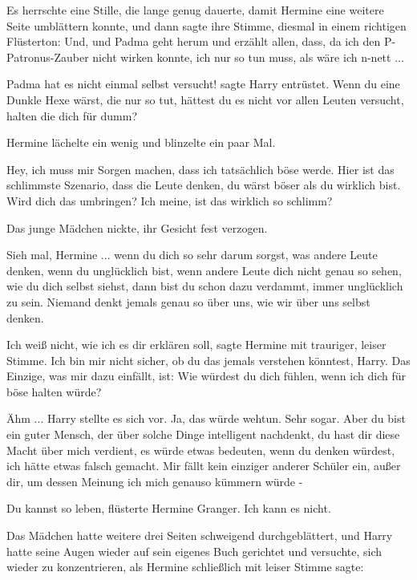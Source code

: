 Es herrschte eine Stille, die lange genug dauerte, damit Hermine eine weitere
Seite umblättern konnte, und dann sagte ihre Stimme, diesmal in einem richtigen
Flüsterton: \glqq{}Und, und Padma geht herum und erzählt allen, dass, da ich den
P-Patronus-Zauber nicht wirken konnte, ich nur so tun muss, als wäre ich
n-nett ...\grqq{}

\glqq{}Padma hat es nicht einmal selbst versucht!\grqq{} sagte Harry entrüstet.
\glqq{}Wenn du eine Dunkle Hexe wärst, die nur so tut, hättest du es nicht vor
allen Leuten versucht, halten die dich für dumm?\grqq{}

Hermine lächelte ein wenig und blinzelte ein paar Mal.

\glqq{}Hey, ich muss mir Sorgen machen, dass ich tatsächlich böse werde. Hier ist
das schlimmste Szenario, dass die Leute denken, du wärst böser als du wirklich
bist. Wird dich das umbringen? Ich meine, ist das wirklich so schlimm?\grqq{}

Das junge Mädchen nickte, ihr Gesicht fest verzogen.

\glqq{}Sieh mal, Hermine ... wenn du dich so sehr darum sorgst, was andere Leute
denken, wenn du unglücklich bist, wenn andere Leute dich nicht genau so sehen,
wie du dich selbst siehst, dann bist du schon dazu verdammt, immer unglücklich
zu sein. Niemand denkt jemals genau so über uns, wie wir über uns selbst
denken.\grqq{}

\glqq{}Ich weiß nicht, wie ich es dir erklären soll\grqq{}, sagte Hermine mit
trauriger, leiser Stimme. \glqq{}Ich bin mir nicht sicher, ob du das jemals
verstehen könntest, Harry. Das Einzige, was mir dazu einfällt, ist: Wie würdest
du dich fühlen, wenn ich dich für böse halten würde?\grqq{}

\glqq{}Ähm ...\grqq{} Harry stellte es sich vor. \glqq{}Ja, das würde wehtun. Sehr
sogar. Aber du bist ein guter Mensch, der über solche Dinge intelligent
nachdenkt, du hast dir diese Macht über mich verdient, es würde etwas bedeuten,
wenn du denken würdest, ich hätte etwas falsch gemacht. Mir fällt kein einziger
anderer Schüler ein, außer dir, um dessen Meinung ich mich genauso kümmern würde
-\grqq{}

\glqq{}Du kannst so leben\grqq{}, flüsterte Hermine Granger. \glqq{}Ich kann es
nicht.\grqq{}

Das Mädchen hatte weitere drei Seiten schweigend durchgeblättert, und Harry
hatte seine Augen wieder auf sein eigenes Buch gerichtet und versuchte, sich
wieder zu konzentrieren, als Hermine schließlich mit leiser Stimme sagte:

